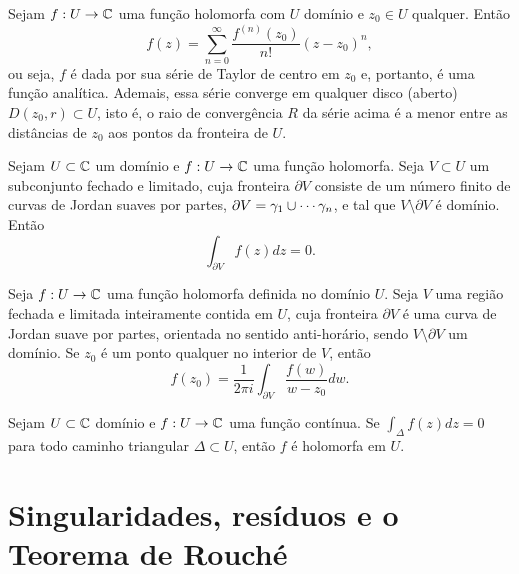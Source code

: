 \begin{teorema}
Sejam $f:U\to\mathbb{C}$ uma função holomorfa com $U$ domínio e $z_0\in U$ qualquer.
Então
\begin{equation*}
    f(z) = \sum_{n=0}^{\infty} \frac{f^{(n)}(z_0)}{n!}(z-z_0)^n,
\end{equation*}
ou seja, $f$ é dada por sua série de Taylor de centro em $z_0$ e, portanto, é uma função analítica.
Ademais, essa série converge em qualquer disco (aberto) $D(z_0, r) \subset U$, isto é, o raio de convergência $R$ da série acima é a menor entre as distâncias de $z_0$ aos pontos da fronteira de $U$.
\end{teorema}


\begin{teorema}
\label{teo-cauchy}
Sejam $U\subset\mathbb{C}$ um domínio e $f:U\to\mathbb{C}$ uma função holomorfa. Seja $V\subset U$ um subconjunto fechado e limitado, cuja fronteira $\partial V$ consiste de um número finito de curvas de Jordan
suaves por partes, $\partial V = \gamma_1\cup\cdots\gamma_n$, e tal que
$V\setminus\partial V$ é domínio. Então
\begin{equation*}
    \int_{\partial V} f(z) dz = 0.
\end{equation*}
\end{teorema}

\begin{teorema}
\label{form-integral-cauchy-bis}
Seja $f:U\to\mathbb{C}$ uma função holomorfa definida no domínio $U$. Seja $V$ uma região fechada e limitada inteiramente contida em $U$, 
cuja fronteira $\partial V$ é uma curva de Jordan suave por partes, orientada no sentido anti-horário, sendo $V\setminus\partial V$ um domínio.
Se $z_0$ é um ponto qualquer no interior de $V$, então
\begin{equation*}
    f(z_0) = \frac{1}{2\pi i}\int_{\partial V} \frac{f(w)}{w-z_0} dw.
\end{equation*}
\end{teorema}


\begin{teorema}
\label{teo-morera}
Sejam $U\subset\mathbb{C}$ domínio e $f:U\to\mathbb{C}$ uma função contínua.
Se $\int_{\Delta} f(z) dz = 0$ para todo caminho triangular $\Delta\subset U$, então $f$ é holomorfa em $U$.
\end{teorema}


\section[Singularidades, resíduos e o Teorema de Rouché]{Singularidades, resíduos e o Teorema de Rouché}

